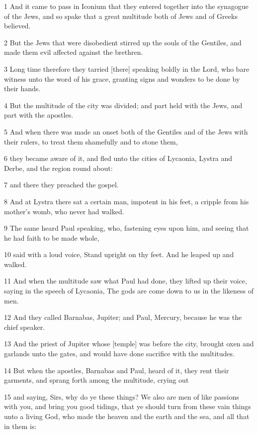 \par 1 And it came to pass in Iconium that they entered together into the synagogue of the Jews, and so spake that a great multitude both of Jews and of Greeks believed.
\par 2 But the Jews that were disobedient stirred up the souls of the Gentiles, and made them evil affected against the brethren.
\par 3 Long time therefore they tarried [there] speaking boldly in the Lord, who bare witness unto the word of his grace, granting signs and wonders to be done by their hands.
\par 4 But the multitude of the city was divided; and part held with the Jews, and part with the apostles.
\par 5 And when there was made an onset both of the Gentiles and of the Jews with their rulers, to treat them shamefully and to stone them,
\par 6 they became aware of it, and fled unto the cities of Lycaonia, Lystra and Derbe, and the region round about:
\par 7 and there they preached the gospel.
\par 8 And at Lystra there sat a certain man, impotent in his feet, a cripple from his mother's womb, who never had walked.
\par 9 The same heard Paul speaking, who, fastening eyes upon him, and seeing that he had faith to be made whole,
\par 10 said with a loud voice, Stand upright on thy feet. And he leaped up and walked.
\par 11 And when the multitude saw what Paul had done, they lifted up their voice, saying in the speech of Lycaonia, The gods are come down to us in the likeness of men.
\par 12 And they called Barnabas, Jupiter; and Paul, Mercury, because he was the chief speaker.
\par 13 And the priest of Jupiter whose [temple] was before the city, brought oxen and garlands unto the gates, and would have done sacrifice with the multitudes.
\par 14 But when the apostles, Barnabas and Paul, heard of it, they rent their garments, and sprang forth among the multitude, crying out
\par 15 and saying, Sirs, why do ye these things? We also are men of like passions with you, and bring you good tidings, that ye should turn from these vain things unto a living God, who made the heaven and the earth and the sea, and all that in them is:
